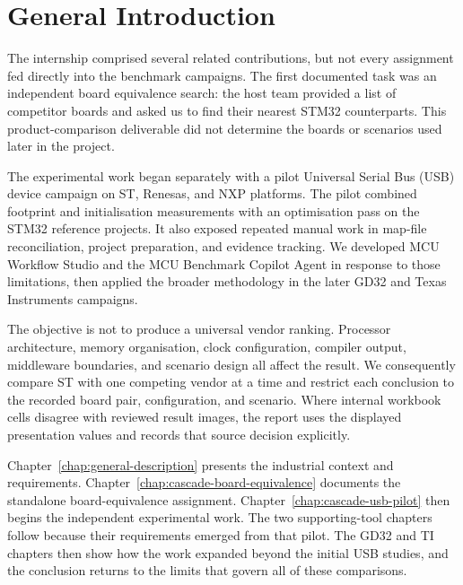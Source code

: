 \chapter*{General Introduction}
{}
\label{chap:cascade-general-introduction}

The internship comprised several related contributions, but not every assignment fed
directly into the benchmark campaigns. The first documented task was an independent board
equivalence search: the host team provided a list of competitor boards and asked us to find
their nearest STM32 counterparts. This product-comparison deliverable did not determine the
boards or scenarios used later in the project.

The experimental work began separately with a pilot Universal Serial Bus (USB) device
campaign on ST, Renesas, and NXP platforms. The pilot combined footprint and initialisation
measurements with an optimisation pass on the STM32 reference projects. It also exposed
repeated manual work in map-file reconciliation, project preparation, and evidence
tracking. We developed MCU Workflow Studio and the MCU Benchmark Copilot Agent in response
to those limitations, then applied the broader methodology in the later GD32 and Texas
Instruments campaigns.

The objective is not to produce a universal vendor ranking. Processor architecture,
memory organisation, clock configuration, compiler output, middleware boundaries, and
scenario design all affect the result. We consequently compare ST with one competing
vendor at a time and restrict each conclusion to the recorded board pair, configuration,
and scenario. Where internal workbook cells disagree with reviewed result images, the
report uses the displayed presentation values and records that source decision explicitly.

Chapter~\ref{chap:general-description} presents the industrial context and requirements.
Chapter~\ref{chap:cascade-board-equivalence} documents the standalone board-equivalence
assignment. Chapter~\ref{chap:cascade-usb-pilot} then begins the independent experimental
work. The two
supporting-tool chapters follow because their requirements emerged from that pilot. The
GD32 and TI chapters then show how the work expanded beyond the initial USB studies, and
the conclusion returns to the limits that govern all of these comparisons.